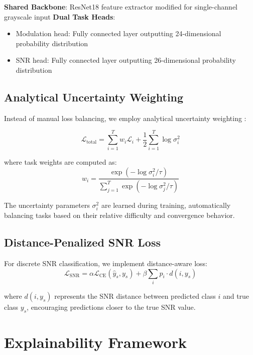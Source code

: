 \documentclass[conference]{IEEEtran}
\begin{document}
\textbf{Shared Backbone}: ResNet18 feature extractor modified for single-channel grayscale input
\textbf{Dual Task Heads}: 
\begin{itemize}
\item Modulation head: Fully connected layer outputting 24-dimensional probability distribution
\item SNR head: Fully connected layer outputting 26-dimensional probability distribution
\end{itemize}

\subsection{Analytical Uncertainty Weighting}

Instead of manual loss balancing, we employ analytical uncertainty weighting \cite{liu2024analytical}:

\begin{equation}
\mathcal{L}_{\text{total}} = \sum_{i=1}^{T} w_i \mathcal{L}_i + \frac{1}{2}\sum_{i=1}^{T} \log \sigma_i^2
\end{equation}

where task weights are computed as:
\begin{equation}
w_i = \frac{\exp(-\log \sigma_i^2 / \tau)}{\sum_{j=1}^{T} \exp(-\log \sigma_j^2 / \tau)}
\end{equation}

The uncertainty parameters $\sigma_i^2$ are learned during training, automatically balancing tasks based on their relative difficulty and convergence behavior.

\subsection{Distance-Penalized SNR Loss}

For discrete SNR classification, we implement distance-aware loss:
\begin{equation}
\mathcal{L}_{\text{SNR}} = \alpha \mathcal{L}_{\text{CE}}(\hat{y}_s, y_s) + \beta \sum_{i} p_i \cdot d(i, y_s)
\end{equation}

where $d(i, y_s)$ represents the SNR distance between predicted class $i$ and true class $y_s$, encouraging predictions closer to the true SNR value.

\section{Explainability Framework}
\end{document}
